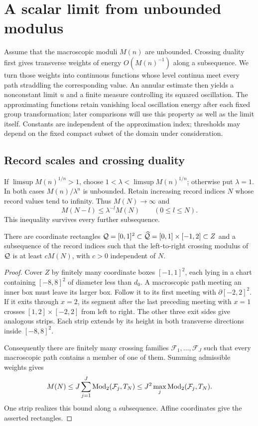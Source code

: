 \section{A scalar limit from unbounded modulus}
\label{sec:scalar}

Assume that the macroscopic moduli $M(n)$ are unbounded. Crossing
duality first gives transverse weights of energy $O(M(n)^{-1})$ along
a subsequence. We turn those weights into continuous functions whose
level continua meet every path straddling the corresponding value.
An annular estimate then yields a nonconstant limit $u$ and a finite
measure controlling its squared oscillation. The approximating functions
retain vanishing local oscillation energy after each fixed group
transformation; later comparisons will use this property as well as the
limit itself. Constants are independent of the approximation index;
thresholds may depend on the fixed compact subset of the domain under
consideration.

\subsection{Record scales and crossing duality}

If $\limsup M(n)^{1/n}>1$, choose
$1<\lambda<\limsup M(n)^{1/n}$; otherwise put $\lambda=1$.
In both cases $M(n)/\lambda^n$ is unbounded. Retain increasing record
indices $N$ whose record values tend to infinity. Thus $M(N)\to\infty$ and
\begin{equation}
 M(N-l)\leq\lambda^{-l}M(N)\qquad(0\leq l\leq N).
 \label{eq:records}
\end{equation}
This inequality survives every further subsequence.

\begin{lemma}
\label{lem:rectangle-localization}
There are coordinate rectangles
$\mathcal Q=[0,1]^2\subset\widehat{\mathcal Q}=[0,1]\times[-1,2]\subset Z$ and a
subsequence of the record indices such that the left-to-right crossing
modulus of $\mathcal Q$ is at least $cM(N)$, with $c>0$ independent of $N$.
\end{lemma}
\begin{proof}
Cover $Z$ by finitely many coordinate boxes $[-1,1]^2$, each lying in
a chart containing $[-8,8]^2$ of diameter less than $d_0$. A macroscopic
path meeting an inner box must leave its larger box. Follow it to its
first meeting with $\partial[-2,2]^2$. If it exits through $x=2$,
its segment after the last preceding meeting with $x=1$ crosses
$[1,2]\times[-2,2]$ from left to right. The other three exit sides
give analogous strips. Each strip extends by its height in both
transverse directions inside $[-8,8]^2$.

Consequently there are finitely many crossing families
$\mathcal F_1,\ldots,\mathcal F_J$ such that every macroscopic path
contains a member of one of them. Summing admissible weights gives
\[
 M(N)\leq J\sum_{j=1}^J\operatorname{Mod}_2(\mathcal F_j,T_N)
       \leq J^2\max_j\operatorname{Mod}_2(\mathcal F_j,T_N).
\]
One strip realizes this bound along a subsequence. Affine coordinates
give the asserted rectangles.
\end{proof}

